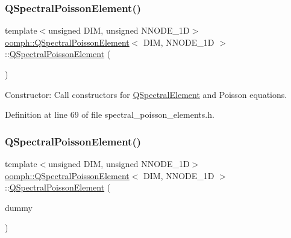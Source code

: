 \subsubsection{\texorpdfstring{Q\+Spectral\+Poisson\+Element()}{QSpectralPoissonElement()}\hspace{0.1cm}{\footnotesize\ttfamily [1/2]}}
{\footnotesize\ttfamily template$<$unsigned D\+IM, unsigned N\+N\+O\+D\+E\+\_\+1D$>$ \\
\hyperlink{classoomph_1_1QSpectralPoissonElement}{oomph\+::\+Q\+Spectral\+Poisson\+Element}$<$ D\+IM, N\+N\+O\+D\+E\+\_\+1D $>$\+::\hyperlink{classoomph_1_1QSpectralPoissonElement}{Q\+Spectral\+Poisson\+Element} (\begin{DoxyParamCaption}{ }\end{DoxyParamCaption})\hspace{0.3cm}{\ttfamily [inline]}}



Constructor\+: Call constructors for \hyperlink{classoomph_1_1QSpectralElement}{Q\+Spectral\+Element} and Poisson equations. 



Definition at line 69 of file spectral\+\_\+poisson\+\_\+elements.\+h.

\mbox{\label{classoomph_1_1QSpectralPoissonElement_a4b8762d8403532d66e8ae9fbed409764}} 
\subsubsection{\texorpdfstring{Q\+Spectral\+Poisson\+Element()}{QSpectralPoissonElement()}\hspace{0.1cm}{\footnotesize\ttfamily [2/2]}}
{\footnotesize\ttfamily template$<$unsigned D\+IM, unsigned N\+N\+O\+D\+E\+\_\+1D$>$ \\
\hyperlink{classoomph_1_1QSpectralPoissonElement}{oomph\+::\+Q\+Spectral\+Poisson\+Element}$<$ D\+IM, N\+N\+O\+D\+E\+\_\+1D $>$\+::\hyperlink{classoomph_1_1QSpectralPoissonElement}{Q\+Spectral\+Poisson\+Element} (\begin{DoxyParamCaption}\item[{const \hyperlink{classoomph_1_1QSpectralPoissonElement}{Q\+Spectral\+Poisson\+Element}$<$ D\+IM, N\+N\+O\+D\+E\+\_\+1D $>$ \&}]{dummy }\end{DoxyParamCaption})\hspace{0.3cm}{\ttfamily [inline]}}



